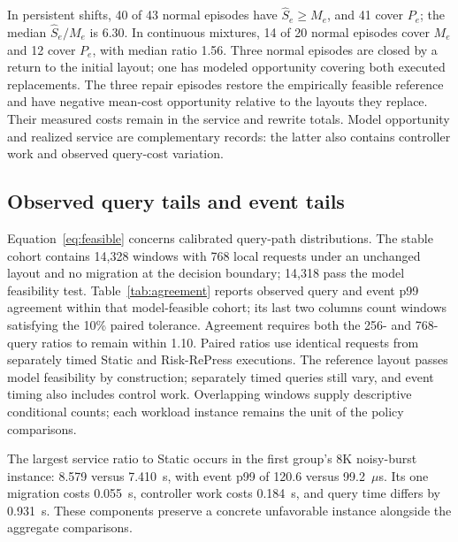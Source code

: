 In persistent shifts, 40 of 43 normal episodes have $\widehat S_e\geq M_e$, and 41 cover $P_e$; the median $\widehat S_e/M_e$ is 6.30. In continuous mixtures, 14 of 20 normal episodes cover $M_e$ and 12 cover $P_e$, with median ratio 1.56. Three normal episodes are closed by a return to the initial layout; one has modeled opportunity covering both executed replacements. The three repair episodes restore the empirically feasible reference and have negative mean-cost opportunity relative to the layouts they replace. Their measured costs remain in the service and rewrite totals. Model opportunity and realized service are complementary records: the latter also contains controller work and observed query-cost variation.

\subsection{Observed query tails and event tails}
Equation~\eqref{eq:feasible} concerns calibrated query-path distributions. The stable cohort contains 14,328 windows with 768 local requests under an unchanged layout and no migration at the decision boundary; 14,318 pass the model feasibility test. Table~\ref{tab:agreement} reports observed query and event p99 agreement within that model-feasible cohort; its last two columns count windows satisfying the 10\% paired tolerance. Agreement requires both the 256- and 768-query ratios to remain within 1.10. Paired ratios use identical requests from separately timed Static and Risk-RePress executions. The reference layout passes model feasibility by construction; separately timed queries still vary, and event timing also includes control work. Overlapping windows supply descriptive conditional counts; each workload instance remains the unit of the policy comparisons.


The largest service ratio to Static occurs in the first group's 8K noisy-burst instance: 8.579 versus 7.410~s, with event p99 of 120.6 versus 99.2~$\mu$s. Its one migration costs 0.055~s, controller work costs 0.184~s, and query time differs by 0.931~s. These components preserve a concrete unfavorable instance alongside the aggregate comparisons.


